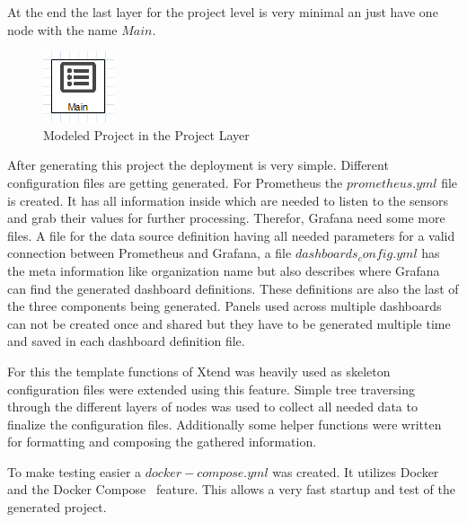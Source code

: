 At the end the last layer for the project level is very minimal an just have one node with the name $Main$.

\begin{figure}[H]
	\centering
	\includegraphics{assets/images/projectLayer}
	\caption{Modeled Project in the Project Layer}
\end{figure}

After generating this project the  deployment is very simple. Different configuration files are getting generated. For Prometheus the $prometheus.yml$ file is created. It has all information inside which are needed to listen to the sensors and grab their values for further processing. Therefor, Grafana need some more files. A file for the data source definition having all needed parameters for a valid connection between Prometheus and Grafana, a file $dashboards_config.yml$ has the meta information like organization name but also describes where Grafana can find the generated dashboard definitions. These definitions are also the last of the three components being generated. Panels used across multiple dashboards can not be created once and shared but they have to be generated multiple time and saved in each dashboard definition file.

For this the template functions of Xtend was heavily used as skeleton configuration files were extended using this feature. Simple tree traversing through the different layers of nodes was used to collect all needed data to finalize the configuration files. Additionally some helper functions were written for formatting and composing the gathered information. 

To make testing easier a $docker-compose.yml$ was created. It utilizes Docker and the Docker Compose~\cite{poulton2019docker} feature.  This allows a very fast startup and test of the generated project.

